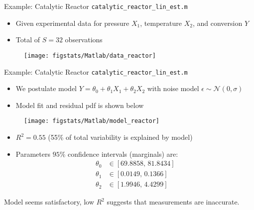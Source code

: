 \documentclass[9pt]{beamer}
\begin{document}
%
\begin{frame}{Example: Catalytic Reactor \footnotesize{\texttt{catalytic\_reactor\_lin\_est.m}}}

\begin{block}{}
\begin{itemize}
\setlength{\itemsep}{5pt}
\item Given experimental data for pressure $X_1$, temperature $X_2$, and conversion $Y$ 
\item Total of $S=32$ observations
\end{itemize}
\end{block}


\begin{figure}[!htb]
    \centering
	\texttt{[image: figstats/Matlab/data\_reactor]}
\end{figure}

\end{frame}

%
\begin{frame}{Example: Catalytic Reactor \footnotesize{\texttt{catalytic\_reactor\_lin\_est.m}}}

\begin{block}{}
\begin{itemize}
\item We postulate model $Y=\theta_0+\theta_1X_1 + \theta_2 X_2$ with noise model $\epsilon \sim \mathcal{N}(0,\sigma)$
\item Model fit and residual pdf is shown below 
\end{itemize}
\end{block}


\begin{figure}[!htb]
    \centering
	\texttt{[image: figstats/Matlab/model\_reactor]}
\end{figure}

\begin{itemize}
\item $R^2=0.55$ (55\% of total variability is explained by model)
\item Parameters $95\%$ confidence intervals (marginals) are:
\begin{align*}
 \theta_0&\in [69.8858, \,81.8434]\\ 
 \theta_1&\in  [0.0149,\,    0.1366]\\
  \theta_2&\in [1.9946,\,   4.4299]
\end{align*}
\end{itemize}
\begin{block}{}
\begin{center}
Model seems satisfactory, low $R^2$ suggests that measurements are inaccurate. 
\end{center}
\end{block}

\end{frame}
\end{document}
